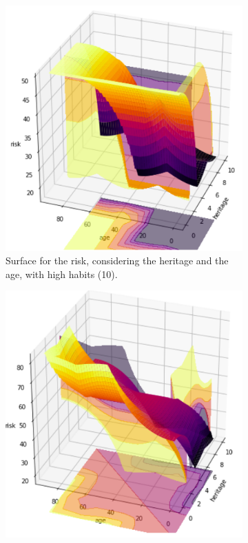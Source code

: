 \begin{figure}[ht]
\begin{subfigure}{.3\textwidth}
  \centering
  \includegraphics[width=.8\linewidth]{figures/heritage-age10.png}  
  \caption{Surface for the risk, considering the heritage and the age, with high habits (10).}
  \label{fig:sur1}
\end{subfigure}
\begin{subfigure}{.3\textwidth}
  \centering
  \includegraphics[width=.8\linewidth]{figures/heritage-age5.png}  

\end{subfigure}
\end{figure}
